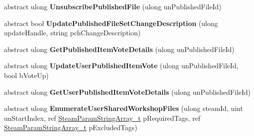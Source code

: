 \begin{DoxyCompactItemize}
\item 
\mbox{\label{class_valve_1_1_steamworks_1_1_i_steam_remote_storage_a316256e346c24d7384a4136387c17dc7}} 
abstract ulong {\bfseries Unsubscribe\+Published\+File} (ulong un\+Published\+File\+Id)
\item 
\mbox{\label{class_valve_1_1_steamworks_1_1_i_steam_remote_storage_acc148cb88789f6f710e61bfe67f30022}} 
abstract bool {\bfseries Update\+Published\+File\+Set\+Change\+Description} (ulong update\+Handle, string pch\+Change\+Description)
\item 
\mbox{\label{class_valve_1_1_steamworks_1_1_i_steam_remote_storage_a70330fa5e560b4d7113ebc1aed130bf5}} 
abstract ulong {\bfseries Get\+Published\+Item\+Vote\+Details} (ulong un\+Published\+File\+Id)
\item 
\mbox{\label{class_valve_1_1_steamworks_1_1_i_steam_remote_storage_ac7d1ff6874a3eae64dfcd8ca951d1e52}} 
abstract ulong {\bfseries Update\+User\+Published\+Item\+Vote} (ulong un\+Published\+File\+Id, bool b\+Vote\+Up)
\item 
\mbox{\label{class_valve_1_1_steamworks_1_1_i_steam_remote_storage_aeb2be984712de4e15eb923f98fd1d860}} 
abstract ulong {\bfseries Get\+User\+Published\+Item\+Vote\+Details} (ulong un\+Published\+File\+Id)
\item 
\mbox{\label{class_valve_1_1_steamworks_1_1_i_steam_remote_storage_a10959314e6e75b8f7da4a605fa0f31f1}} 
abstract ulong {\bfseries Enumerate\+User\+Shared\+Workshop\+Files} (ulong steam\+Id, uint un\+Start\+Index, ref \hyperlink{struct_valve_1_1_steamworks_1_1_steam_param_string_array__t}{Steam\+Param\+String\+Array\+\_\+t} p\+Required\+Tags, ref \hyperlink{struct_valve_1_1_steamworks_1_1_steam_param_string_array__t}{Steam\+Param\+String\+Array\+\_\+t} p\+Excluded\+Tags)
\item 
\mbox{\label{class_valve_1_1_steamworks_1_1_i_steam_remote_storage_ac72d3abdbe807aafb4c2e69b3cf267c0}} 

\end{DoxyCompactItemize}
